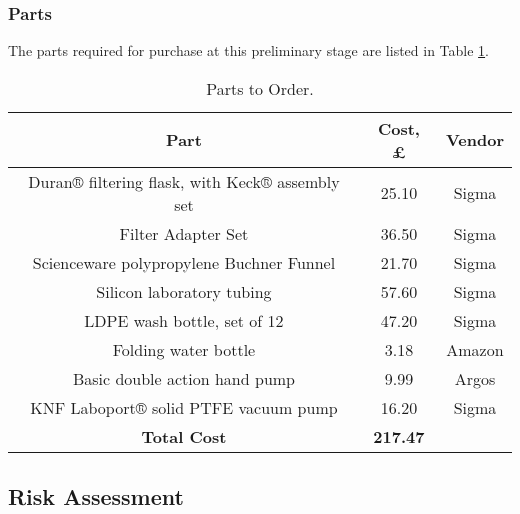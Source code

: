 \documentclass[12pt]{article}
\begin{document}
\subsubsection{Parts}

The parts required for purchase at this preliminary stage are listed in Table \ref{tab:partsorder}.

\begin{table}[]
\centering
\begin{tabular}{|c|c|c|}
\hline
\textbf{Part}                                   & \textbf{Cost, \pounds} & \textbf{Vendor} \\ \hline
Duran® filtering flask, with Keck® assembly set & 25.10                                & Sigma           \\ \hline
Filter Adapter Set                              & 36.50                                & Sigma           \\ \hline
Scienceware polypropylene Buchner Funnel        & 21.70                                & Sigma           \\ \hline
Silicon laboratory tubing                       & 57.60                                & Sigma           \\ \hline
LDPE wash bottle, set of 12                     & 47.20                                & Sigma           \\ \hline
Folding water bottle                            & 3.18                                 & Amazon          \\ \hline
Basic double action hand pump                   & 9.99                                 & Argos           \\ \hline
KNF Laboport® solid PTFE vacuum pump            & 16.20                                & Sigma           \\ \hline
\textbf{Total Cost}                             & \textbf{217.47}                      & \textbf{}       \\ \hline
\end{tabular}
\caption{\label{tab:partsorder}Parts to Order.}
\end{table}

\subsection{Risk Assessment}
\end{document}
